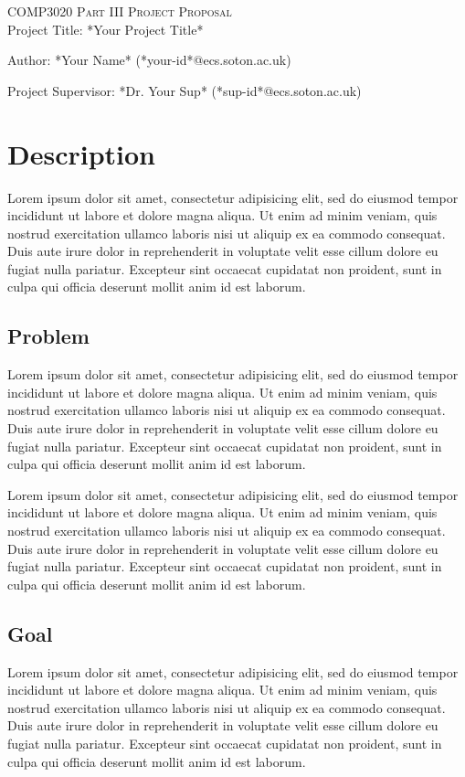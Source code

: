 \documentclass[10pt,a4paper]{article}
\begin{document}
\begin{titlepage}
 

\textsc{\LARGE{COMP3020 Part III Project Proposal}}\\[0.0cm]

\large{Project Title: *Your Project Title*}

\large{Author: *Your Name* (*your-id*@ecs.soton.ac.uk)}

\large{Project Supervisor: *Dr. Your Sup* (*sup-id*@ecs.soton.ac.uk)}

\section{Description}
Lorem ipsum dolor sit amet, consectetur adipisicing elit, sed do eiusmod tempor incididunt ut labore et dolore magna aliqua. Ut enim ad minim veniam, quis nostrud exercitation ullamco laboris nisi ut aliquip ex ea commodo consequat. Duis aute irure dolor in reprehenderit in voluptate velit esse cillum dolore eu fugiat nulla pariatur. Excepteur sint occaecat cupidatat non proident, sunt in culpa qui officia deserunt mollit anim id est laborum.

\subsection{Problem}
Lorem ipsum dolor sit amet, consectetur adipisicing elit, sed do eiusmod tempor incididunt ut labore et dolore magna aliqua. Ut enim ad minim veniam, quis nostrud exercitation ullamco laboris nisi ut aliquip ex ea commodo consequat. Duis aute irure dolor in reprehenderit in voluptate velit esse cillum dolore eu fugiat nulla pariatur. Excepteur sint occaecat cupidatat non proident, sunt in culpa qui officia deserunt mollit anim id est laborum.

Lorem ipsum dolor sit amet, consectetur adipisicing elit, sed do eiusmod tempor incididunt ut labore et dolore magna aliqua. Ut enim ad minim veniam, quis nostrud exercitation ullamco laboris nisi ut aliquip ex ea commodo consequat. Duis aute irure dolor in reprehenderit in voluptate velit esse cillum dolore eu fugiat nulla pariatur. Excepteur sint occaecat cupidatat non proident, sunt in culpa qui officia deserunt mollit anim id est laborum.

\subsection{Goal}
Lorem ipsum dolor sit amet, consectetur adipisicing elit, sed do eiusmod tempor incididunt ut labore et dolore magna aliqua. Ut enim ad minim veniam, quis nostrud exercitation ullamco laboris nisi ut aliquip ex ea commodo consequat. Duis aute irure dolor in reprehenderit in voluptate velit esse cillum dolore eu fugiat nulla pariatur. Excepteur sint occaecat cupidatat non proident, sunt in culpa qui officia deserunt mollit anim id est laborum.


\end{titlepage}
\end{document}
